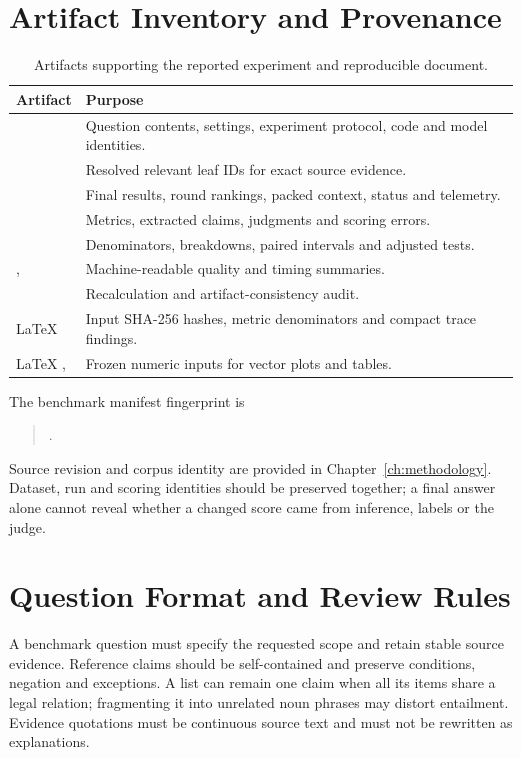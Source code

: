 \section{Artifact Inventory and Provenance}
\begin{table}[H]\centering\small
\caption{Artifacts supporting the reported experiment and reproducible document.}\label{tab:artifacts}
\begin{tabularx}{\textwidth}{P{4.2cm}Y}\toprule
\textbf{Artifact} & \textbf{Purpose}\\\midrule
{} & Question contents, settings, experiment protocol, code and model identities.\\
 & Resolved relevant leaf IDs for exact source evidence.\\
 & Final results, round rankings, packed context, status and telemetry.\\
 & Metrics, extracted claims, judgments and scoring errors.\\
 & Denominators, breakdowns, paired intervals and adjusted tests.\\
,  & Machine-readable quality and timing summaries.\\
 & Recalculation and artifact-consistency audit.\\
LaTeX  & Input SHA-256 hashes, metric denominators and compact trace findings.\\
LaTeX ,  & Frozen numeric inputs for vector plots and tables.\\\bottomrule
\end{tabularx}
\end{table}
The benchmark manifest fingerprint is
\begin{quote}\footnotesize{}.\end{quote}
Source revision and corpus identity are provided in Chapter~\ref{ch:methodology}. Dataset, run and scoring identities should be preserved together; a final answer alone cannot reveal whether a changed score came from inference, labels or the judge.

\section{Question Format and Review Rules}
A benchmark question must specify the requested scope and retain stable source evidence. Reference claims should be self-contained and preserve conditions, negation and exceptions. A list can remain one claim when all its items share a legal relation; fragmenting it into unrelated noun phrases may distort entailment. Evidence quotations must be continuous source text and must not be rewritten as explanations.

